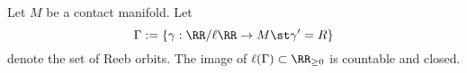 
 
    Let $M$ be a contact manifold. Let 
    \[\Gamma:=\{\gamma: \RR/\ell\RR\to M \st\gamma'=R\}\]
    denote the set of Reeb orbits. The image of $\ell(\Gamma)\subset \RR_{\geq 0}$ is countable and closed.
    \label{prp:countableNumberOfReebPeriods}
 